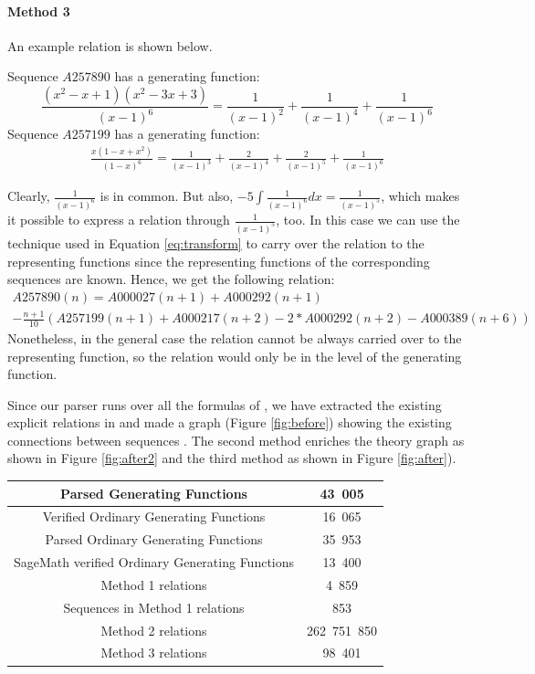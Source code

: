 \paragraph{Method 3} An example relation is shown below.

Sequence $A257890$ has a generating function:
\begin{equation}
\frac{(x^2-x+1)(x^2-3x+3)}{(x-1)^6} = \frac{1}{(x - 1)^2} + \frac{1}{(x - 1)^4} + \frac{1}{(x - 1)^6}
\end{equation}
Sequence $A257199$ has a generating function:
\begin{align}
\frac{x(1 - x + x^2)}{(1 - x)^6} = \frac{1}{(x - 1)^3} + \frac{2}{(x - 1)^4} + \frac{2}{(x - 1)^5} + \frac{1}{(x - 1)
^6}
\end{align}

Clearly, $\frac{1}{(x-1)^6}$ is in common. But also, $-5\int \frac{1}{(x-1)^6} dx = \frac{1}{(x-1)^5}$, which makes
it possible to express a relation through $\frac{1}{(x-1)^5}$, too. In this case we can use the technique used in
Equation \ref{eq:transform} to carry over the relation to the representing functions since the representing functions
 of the corresponding sequences are known. Hence, we get the following relation:
\begin{multline}
A257890(n) = A000027(n+1) + A000292(n+1) \\
- \frac{n+1}{10}(A257199(n+1)
 + A000217(n+2) - 2*A000292(n+2) - A000389(n+6))
\end{multline}
Nonetheless, in the general case the relation cannot be always carried over to the representing function, so the
relation would only be in the level of the generating function.

Since our parser runs over all the formulas of \oeis, we have extracted the existing explicit relations in \oeis and
made a graph (Figure \ref{fig:before}) showing the existing connections between sequences .
The second method enriches the theory graph as shown in Figure \ref{fig:after2} and the third method as shown in
Figure \ref{fig:after}).

\begin{center}
 \begin{tabular}{||c | c||}
 \hline
 Parsed Generating Functions & 43\ 005 \\
 \hline
 Verified Ordinary Generating Functions & 16\ 065 \\
 \hline
 Parsed Ordinary Generating Functions &  35\ 953 \\
 \hline
 SageMath verified Ordinary Generating Functions & 13\ 400 \\
 \hline
 Method 1 relations & 4\ 859 \\
 \hline
 Sequences in Method 1 relations & 853 \\
 \hline
 Method 2 relations & 262\ 751\ 850\\
 \hline
 Method 3 relations & 98\ 401 \\
 \hline
\end{tabular}
\end{center}

